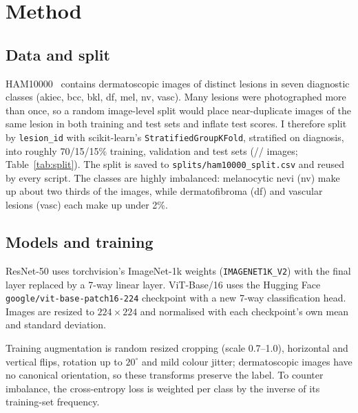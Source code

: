 \section{Method}

\subsection{Data and split}
HAM10000~\cite{tschandl2018ham10000} contains \nImages{} dermatoscopic images of \nLesions{} distinct lesions in seven diagnostic classes (akiec, bcc, bkl, df, mel, nv, vasc).
Many lesions were photographed more than once, so a random image-level split would place near-duplicate images of the same lesion in both training and test sets and inflate test scores.
I therefore split by \texttt{lesion\_id} with scikit-learn's \texttt{StratifiedGroupKFold}, stratified on diagnosis, into roughly 70/15/15\% training, validation and test sets (\nTrain/\nVal/\nTest{} images; Table~\ref{tab:split}).
The split is saved to \texttt{splits/ham10000\_split.csv} and reused by every script.
The classes are highly imbalanced: melanocytic nevi (nv) make up about two thirds of the images, while dermatofibroma (df) and vascular lesions (vasc) each make up under 2\%.

\begin{table}[h]
\centering
\caption{Images per class in each split (lesion-level split).}
\label{tab:split}
\end{table}

\subsection{Models and training}
ResNet-50 uses torchvision's ImageNet-1k weights (\texttt{IMAGENET1K\_V2}) with the final layer replaced by a 7-way linear layer.
ViT-Base/16 uses the Hugging Face \texttt{google/vit-base-patch16-224} checkpoint
with a new 7-way classification head.
Images are resized to $224\times224$ and normalised with each checkpoint's own mean and standard deviation.

Training augmentation is random resized cropping (scale 0.7--1.0), horizontal and vertical flips, rotation up to $20^\circ$ and mild colour jitter; dermatoscopic images have no canonical orientation, so these transforms preserve the label.
To counter imbalance, the cross-entropy loss is weighted per class by the inverse of its training-set frequency.

